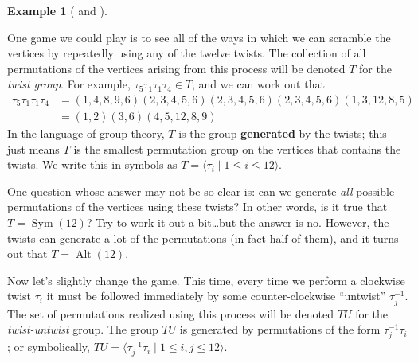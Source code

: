 \documentclass[11pt]{amsart}
\theoremstyle{plain}
\theoremstyle{definition}
\newtheorem{example}{Example}
\theoremstyle{remark}
\DeclareMathOperator{\Sym}{Sym}
\DeclareMathOperator{\Alt}{Alt}
\begin{document}
\begin{example}[{\cite[Section~18 of Chapter~11]{CoSl99} and \cite{NaB-Icosa}}]
\begin{center}
\end{center}


One game we could play is to see all of the ways in which we can scramble the vertices by repeatedly using any of the twelve twists. The collection of all permutations of the vertices arising from this process will be denoted $T$ for the \emph{twist group}. 
For example, $\tau_5\tau_1\tau_1\tau_4 \in T$, and we can work out that 
\begin{align*}
\tau_5\tau_1\tau_1\tau_4 &= (1,4,8,9,6)(2,3,4,5,6)(2,3,4,5,6)(2,3,4,5,6)(1,3,12,8,5)\\
&= (1,2)(3,6)(4,5,12,8,9)
\end{align*}
In the language of group theory, $T$ is the group \textbf{generated} by the twists; this just means $T$ is the smallest permutation group on the vertices that contains the twists. We write this in symbols as $T = \langle \tau_i \mid 1\le i\le 12\rangle$.

One question whose answer may not be so clear is: can we generate \emph{all} possible permutations of the vertices using these twists? In other words, is it true that $T= \Sym(12)$? Try to work it out a bit\ldots but the answer is no. However, the twists can generate a lot of the permutations (in fact half of them), and it turns out that $T= \Alt(12)$.

Now let's slightly change the game. This time, every time we perform a clockwise twist $\tau_i$ it must be followed immediately by some counter-clockwise ``untwist'' $\tau_j^{-1}$. The set of permutations realized using this process will be denoted $TU$ for the \emph{twist-untwist} group. The group $TU$ is generated by permutations of the form $\tau_j^{-1}\tau_i$; or symbolically, $TU = \langle \tau_j^{-1}\tau_i \mid 1\le i,j\le 12\rangle.$ 


\end{example}
\end{document}
